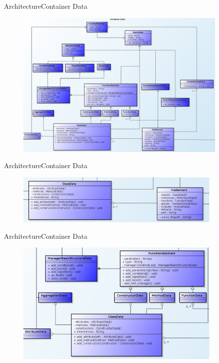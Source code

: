 \documentclass[10pt]{beamer}
\begin{document}
\begin{frame}{Architecture}{Container Data}
  \begin{figure}[containerdata]
    \includegraphics[width=0.93\textwidth]{images/ContainerData.png}
  \end{figure}
\end{frame}

\begin{frame}{Architecture}{Container Data}
  \begin{figure}[classAndFileElement]
    \includegraphics[width=0.9\textwidth]{images/classAndFileElementData.png}
  \end{figure}
\end{frame}

\begin{frame}{Architecture}{Container Data}
  \begin{figure}[overview]
    \includegraphics[width=0.9\textwidth]{images/functionBehaviour.png}
  \end{figure}
\end{frame}
\end{document}
